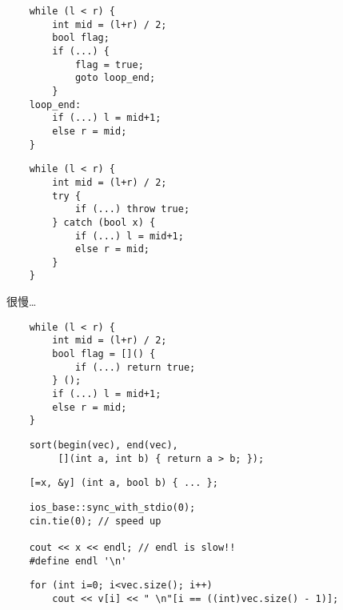 \documentclass[standalone]{beamer}
\begin{document}
\begin{frame}[fragile]{}
  \begin{verbatim}
    while (l < r) {
        int mid = (l+r) / 2;
        bool flag;
        if (...) {
            flag = true;
            goto loop_end;
        }
    loop_end:
        if (...) l = mid+1;
        else r = mid;
    }
  \end{verbatim}
\end{frame}

\begin{frame}[fragile]{}
  \begin{verbatim}
    while (l < r) {
        int mid = (l+r) / 2;
        try {
            if (...) throw true;
        } catch (bool x) {
            if (...) l = mid+1;
            else r = mid;
        }
    }
  \end{verbatim}
  \pause
  很慢…
\end{frame}

\begin{frame}[fragile]{}
  \begin{verbatim}
    while (l < r) {
        int mid = (l+r) / 2;
        bool flag = []() {
            if (...) return true;
        } ();
        if (...) l = mid+1;
        else r = mid;
    }
  \end{verbatim}
\end{frame}

\begin{frame}[fragile]{}
  \onslide<+->
  \begin{verbatim}
    sort(begin(vec), end(vec),
         [](int a, int b) { return a > b; });
  \end{verbatim}

  \onslide<+->
  \begin{verbatim}
    [=x, &y] (int a, bool b) { ... };
  \end{verbatim}
\end{frame}

\begin{frame}[fragile]{}
  \onslide<+->
  \begin{verbatim}
    ios_base::sync_with_stdio(0);
    cin.tie(0); // speed up

    cout << x << endl; // endl is slow!!
    #define endl '\n'
  \end{verbatim}

  \onslide<+->
  \begin{verbatim}
    for (int i=0; i<vec.size(); i++)
        cout << v[i] << " \n"[i == ((int)vec.size() - 1)];
  \end{verbatim}
\end{frame}
\end{document}
